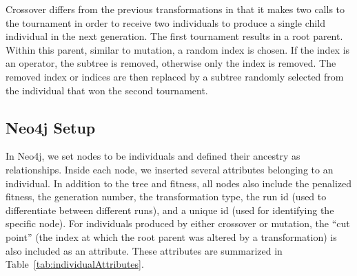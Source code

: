 \documentclass[12pt]{article}
\begin{document}
Crossover differs from the previous transformations in that it makes two calls to the tournament in order to receive two individuals to produce a single child individual in the next generation. The first tournament results in a root parent. Within this parent, similar to mutation, a random index is chosen. If the index is an operator, the subtree is removed, otherwise only the index is removed. The removed index or indices are then replaced by a subtree randomly selected from the individual that won the second tournament.

\subsection{Neo4j Setup}
\label{sec:Neo4jSetup}

In Neo4j, we set nodes to be individuals and defined their ancestry as relationships. Inside each node, we inserted several attributes belonging to an individual. In addition to the tree and fitness, all nodes also include the penalized fitness, the generation number, the transformation type, the run id (used to differentiate between different runs), and a unique id (used for identifying the specific node). For individuals produced by either crossover or mutation, the ``cut point'' (the index at which the root parent was altered by a transformation) is also included as an attribute. These attributes are summarized in Table~\ref{tab:individualAttributes}.
\begin{table}[tb]
\begin{center}
\caption{Chart summarizing attributes that are recorded for individuals produced by each transformation type.}
\label{tab:individualAttributes}
\end{center}
\end{table}
\end{document}

